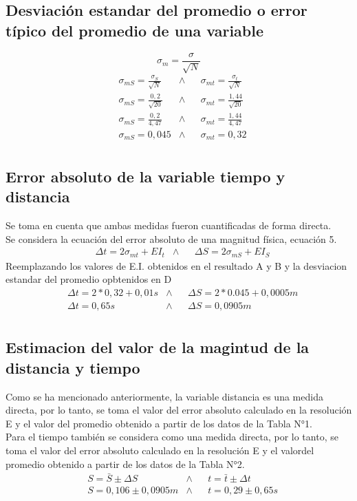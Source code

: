 \documentclass[runningheads]{llncs}
\begin{document}
\subsection*{Desviación estandar del promedio o error típico del promedio de una variable} 
    \begin{equation}
        \sigma_{m}=\frac{\sigma}{\sqrt{N}}
    \end{equation}
    \begin{align*}
        &\sigma_{mS}=\frac{\sigma_{S}}{\sqrt{N}}
        &\wedge&
        &\sigma_{mt}=\frac{\sigma_{t}}{\sqrt{N}}\\
        &\sigma_{mS}=\frac{0,2}{\sqrt{20}}
        &\wedge&
        &\sigma_{mt}=\frac{1,44}{\sqrt{20}}\\
        &\sigma_{mS}=\frac{0,2}{4,47}
        &\wedge&
        &\sigma_{mt}=\frac{1,44}{4,47}\\
        &\sigma_{mS}=0,045
        &\wedge&
        &\sigma_{mt}=0,32 \tag{D}\\
    \end{align*}
\subsection*{Error absoluto de la variable tiempo y distancia}
Se toma en cuenta que ambas medidas fueron cuantificadas de forma directa.\\
Se considera la ecuación del error absoluto de una magnitud física, ecuación 5.\\ 
    \begin{align*}
        &\Delta t=2\sigma_{mt}+EI_{t}
        &\wedge&
        &\Delta S=2\sigma_{mS}+EI_{S}
    \end{align*}
    Reemplazando los valores de E.I. obtenidos en el resultado A y B y la desviacion estandar del promedio opbtenidos en D
    \begin{align*}
        &\Delta t=2*0,32+0,01 s
        &\wedge&
        &\Delta S=2*0.045+0,0005 m\\
        &\Delta t=0,65 s
        &\wedge&
        &\Delta S=0,0905 m \tag{E}\\
    \end{align*}
\subsection*{Estimacion del valor de la magintud de la distancia y tiempo}
Como se ha mencionado anteriormente, la variable distancia es una medida directa, por lo tanto, se toma el valor del error absoluto calculado en la resolución E y el valor del promedio obtenido a partir de los datos de la Tabla N°1.\\
Para el tiempo también se considera como una medida directa, por lo tanto, se toma el valor del error absoluto calculado en la resolución E y el valordel promedio obtenido a partir de los datos de la Tabla N°2.\\
    \begin{align*}
        &S=\bar{S}\pm \Delta S
        &\wedge&
        &t=\bar{t}\pm \Delta t\\
        &S=0,106\pm 0,0905 m
        &\wedge&
        &t=0,29\pm 0,65 s \tag{F}\\
    \end{align*}
\end{document}
